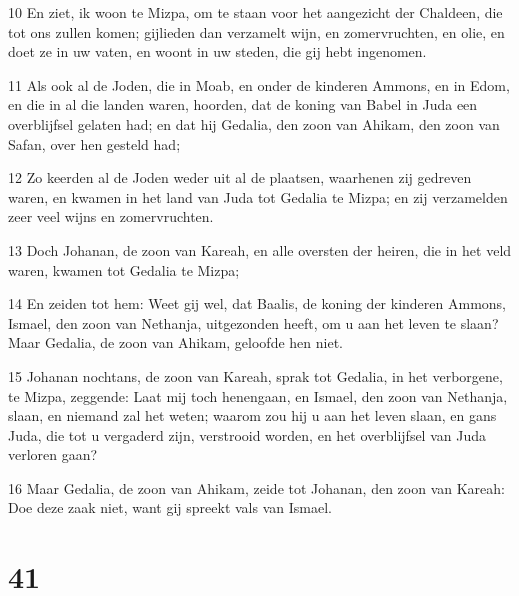 \par 10 En ziet, ik woon te Mizpa, om te staan voor het aangezicht der Chaldeen, die tot ons zullen komen; gijlieden dan verzamelt wijn, en zomervruchten, en olie, en doet ze in uw vaten, en woont in uw steden, die gij hebt ingenomen.
\par 11 Als ook al de Joden, die in Moab, en onder de kinderen Ammons, en in Edom, en die in al die landen waren, hoorden, dat de koning van Babel in Juda een overblijfsel gelaten had; en dat hij Gedalia, den zoon van Ahikam, den zoon van Safan, over hen gesteld had;
\par 12 Zo keerden al de Joden weder uit al de plaatsen, waarhenen zij gedreven waren, en kwamen in het land van Juda tot Gedalia te Mizpa; en zij verzamelden zeer veel wijns en zomervruchten.
\par 13 Doch Johanan, de zoon van Kareah, en alle oversten der heiren, die in het veld waren, kwamen tot Gedalia te Mizpa;
\par 14 En zeiden tot hem: Weet gij wel, dat Baalis, de koning der kinderen Ammons, Ismael, den zoon van Nethanja, uitgezonden heeft, om u aan het leven te slaan? Maar Gedalia, de zoon van Ahikam, geloofde hen niet.
\par 15 Johanan nochtans, de zoon van Kareah, sprak tot Gedalia, in het verborgene, te Mizpa, zeggende: Laat mij toch henengaan, en Ismael, den zoon van Nethanja, slaan, en niemand zal het weten; waarom zou hij u aan het leven slaan, en gans Juda, die tot u vergaderd zijn, verstrooid worden, en het overblijfsel van Juda verloren gaan?
\par 16 Maar Gedalia, de zoon van Ahikam, zeide tot Johanan, den zoon van Kareah: Doe deze zaak niet, want gij spreekt vals van Ismael.

\chapter{41}

